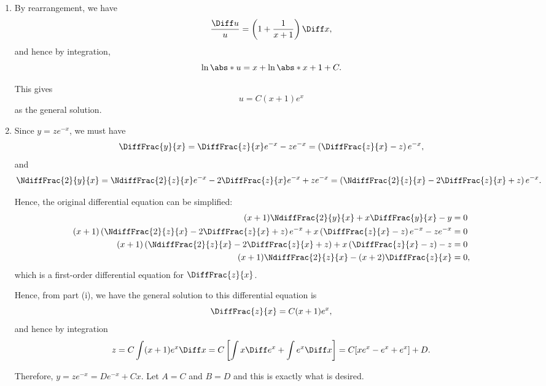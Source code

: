 \Question{\currfilebase}

\begin{enumerate}
    \item By rearrangement, we have
          \[
              \frac{\Diff u}{u} = \left(1 + \frac{1}{x + 1}\right) \Diff x,
          \]
          and hence by integration,
          \[
              \ln \abs*{u} = x + \ln\abs*{x + 1} + C.
          \]

          This gives
          \[
              u = C (x + 1) e^x
          \]
          as the general solution.

    \item Since \(y = z e^{-x}\), we must have
          \[
              \DiffFrac{y}{x} = \DiffFrac{z}{x} e^{-x} - z e^{-x} = \left(\DiffFrac{z}{x} - z\right) e^{-x},
          \]
          and
          \[
              \NdiffFrac{2}{y}{x} = \NdiffFrac{2}{z}{x} e^{-x} - 2 \DiffFrac{z}{x} e^{-x} + z e^{-x} = \left(\NdiffFrac{2}{z}{x} - 2 \DiffFrac{z}{x} + z\right) e^{-x}.
          \]

          Hence, the original differential equation can be simplified:
          \begin{align*}
              (x + 1) \NdiffFrac{2}{y}{x} + x \DiffFrac{y}{x} - y                                                                            & = 0  \\
              (x + 1) \left(\NdiffFrac{2}{z}{x} - 2 \DiffFrac{z}{x} + z\right) e^{-x} + x \left(\DiffFrac{z}{x} - z\right) e^{-x} - z e^{-x} & = 0  \\
              (x + 1) \left(\NdiffFrac{2}{z}{x} - 2 \DiffFrac{z}{x} + z\right) + x \left(\DiffFrac{z}{x} - z\right) - z                      & = 0  \\
              (x + 1) \NdiffFrac{2}{z}{x} - (x + 2)\DiffFrac{z}{x}                                                                           & = 0,
          \end{align*}
          which is a first-order differential equation for \(\DiffFrac{z}{x}\).

          Hence, from part (i), we have the general solution to this differential equation is
          \[
              \DiffFrac{z}{x} = C(x + 1)e^x,
          \]
          and hence by integration
          \[
              z = C \int (x + 1) e^x \Diff x = C \left[\int x \Diff e^x + \int e^x \Diff x\right] = C [xe^x - e^x + e^x] + D.
          \]

          Therefore, \(y = z e^{-x} = De^{-x} + Cx\). Let \(A = C\) and \(B = D\) and this is exactly what is desired.


\end{enumerate}
